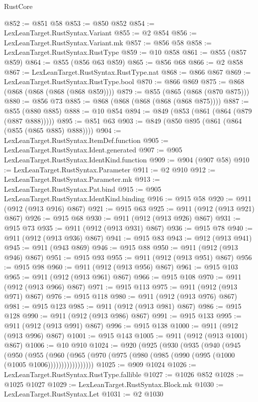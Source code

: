 \begin{lexlean}{RustCore}
\begin{coremodule}
@852 := @851 @58
@853 := @850 @852
@854 := LexLeanTarget.RustSyntax.Variant
@855 := @2 @854
@856 := LexLeanTarget.RustSyntax.Variant.mk
@857 := @856 @58
@858 := LexLeanTarget.RustSyntax.RustType
@859 := @10 @858
@861 := @855 (@857 @859)
@864 := @855 (@856 @63 @859)
@865 := @856 @68
@866 := @2 @858
@867 := LexLeanTarget.RustSyntax.RustType.nat
@868 := @866 @867
@869 := LexLeanTarget.RustSyntax.RustType.bool
@870 := @866 @869
@875 := @868 (@868 (@868 (@868 (@868 @859))))
@879 := @855 (@865 (@868 (@870 @875)))
@880 := @856 @73
@885 := @868 (@868 (@868 (@868 (@868 @875))))
@887 := @855 (@880 @885)
@888 := @10 @854
@894 := @849 (@853 (@861 (@864 (@879 (@887 @888)))))
@895 := @851 @63
@903 := @849 (@850 @895 (@861 (@864 (@855 (@865 @885) @888))))
@904 := LexLeanTarget.RustSyntax.ItemDef.function
@905 := LexLeanTarget.RustSyntax.Ident.generated
@907 := @905 LexLeanTarget.RustSyntax.IdentKind.function
@909 := @904 (@907 @58)
@910 := LexLeanTarget.RustSyntax.Parameter
@911 := @2 @910
@912 := LexLeanTarget.RustSyntax.Parameter.mk
@913 := LexLeanTarget.RustSyntax.Pat.bind
@915 := @905 LexLeanTarget.RustSyntax.IdentKind.binding
@916 := @915 @58
@920 := @911 (@912 (@913 @916) @867)
@921 := @915 @63
@925 := @911 (@912 (@913 @921) @867)
@926 := @915 @68
@930 := @911 (@912 (@913 @926) @867)
@931 := @915 @73
@935 := @911 (@912 (@913 @931) @867)
@936 := @915 @78
@940 := @911 (@912 (@913 @936) @867)
@941 := @915 @83
@943 := @912 (@913 @941)
@945 := @911 (@943 @869)
@946 := @915 @88
@950 := @911 (@912 (@913 @946) @867)
@951 := @915 @93
@955 := @911 (@912 (@913 @951) @867)
@956 := @915 @98
@960 := @911 (@912 (@913 @956) @867)
@961 := @915 @103
@965 := @911 (@912 (@913 @961) @867)
@966 := @915 @108
@970 := @911 (@912 (@913 @966) @867)
@971 := @915 @113
@975 := @911 (@912 (@913 @971) @867)
@976 := @915 @118
@980 := @911 (@912 (@913 @976) @867)
@981 := @915 @123
@985 := @911 (@912 (@913 @981) @867)
@986 := @915 @128
@990 := @911 (@912 (@913 @986) @867)
@991 := @915 @133
@995 := @911 (@912 (@913 @991) @867)
@996 := @915 @138
@1000 := @911 (@912 (@913 @996) @867)
@1001 := @915 @143
@1005 := @911 (@912 (@913 @1001) @867)
@1006 := @10 @910
@1024 := @920
    (@925
      (@930
        (@935
          (@940
            (@945
              (@950
                (@955
                  (@960
                    (@965 (@970 (@975 (@980 (@985 (@990 (@995 (@1000 (@1005 @1006)))))))))))))))))
@1025 := @909 @1024
@1026 := LexLeanTarget.RustSyntax.RustType.fallible
@1027 := @1026 @852
@1028 := @1025 @1027
@1029 := LexLeanTarget.RustSyntax.Block.mk
@1030 := LexLeanTarget.RustSyntax.Let
@1031 := @2 @1030

\end{coremodule}
\end{lexlean}
